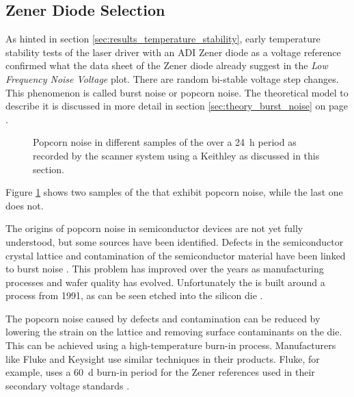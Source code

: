 \subsection{Zener Diode Selection}%
\label{sec:zener_diode_selection}
As hinted in section \ref{sec:results_temperature_stability}, early temperature stability tests of the laser driver with an ADI  Zener diode as a voltage reference confirmed what the data sheet of the Zener diode \cite{datasheet_LM399} already suggest in the \textit{Low Frequency Noise Voltage} plot. There are random bi-stable voltage step changes. This phenomenon is called burst noise or popcorn noise. The theoretical model to describe it is discussed in more detail in section \ref{sec:theory_burst_noise} on page \pageref{sec:theory_burst_noise}.
\begin{figure}[ht]
    \centering
    \caption{Popcorn noise in different samples of the  over a \qty{24}{\hour} period as recorded by the scanner system using a Keithley  as discussed in this section.}
    \label{fig:popcorn_noise_lm399}
\end{figure}

Figure \ref{fig:popcorn_noise_lm399} shows two samples of the  that exhibit popcorn noise, while the last one does not.

The origins of popcorn noise in semiconductor devices are not yet fully understood, but some sources have been identified. Defects in the semiconductor crystal lattice and contamination of the semiconductor material have been linked to burst noise \cite{technote_ti_popcorn_noise}. This problem has improved over the years as manufacturing processes and wafer quality has evolved. Unfortunately the  is built around a process from 1991, as can be seen etched into the silicon die \cite{lm399_richi}.

The popcorn noise caused by defects and contamination can be reduced by lowering the strain on the lattice and removing surface contaminants on the die. This can be achieved using a high-temperature burn-in process. Manufacturers like Fluke and Keysight use similar techniques in their products. Fluke, for example, uses a \qty{60}{\day} burn-in period for the Zener references used in their secondary voltage standards \cite{zener_popcorn_noise}.


